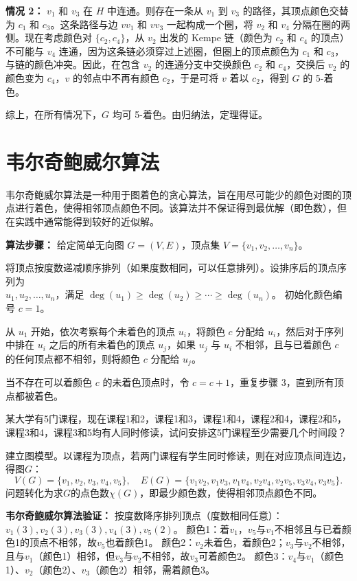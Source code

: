     \textbf{情况 2：} $v_1$ 和 $v_3$ 在 $H$ 中连通。则存在一条从 $v_1$ 到 $v_3$ 的路径，其顶点颜色交替为 $c_1$ 和 $c_3$。这条路径与边 $v v_1$ 和 $v v_3$ 一起构成一个圈，将 $v_2$ 和 $v_4$ 分隔在圈的两侧。现在考虑颜色对 $\{c_2, c_4\}$，从 $v_2$ 出发的 Kempe 链（颜色为 $c_2$ 和 $c_4$ 的顶点）不可能与 $v_4$ 连通，因为这条链必须穿过上述圈，但圈上的顶点颜色为 $c_1$ 和 $c_3$，与链的颜色冲突。因此，在包含 $v_2$ 的连通分支中交换颜色 $c_2$ 和 $c_4$，交换后 $v_2$ 的颜色变为 $c_4$，$v$ 的邻点中不再有颜色 $c_2$，于是可将 $v$ 着以 $c_2$，得到 $G$ 的 5-着色。

    综上，在所有情况下，$G$ 均可 5-着色。由归纳法，定理得证。
\section{韦尔奇鲍威尔算法}
    韦尔奇鲍威尔算法是一种用于图着色的贪心算法，旨在用尽可能少的颜色对图的顶点进行着色，使得相邻顶点颜色不同。该算法并不保证得到最优解（即色数），但在实践中通常能得到较好的近似解。

    \textbf{算法步骤：}
    给定简单无向图 $G=(V,E)$，顶点集 $V=\{v_1,v_2,\ldots,v_n\}$。
    
         将顶点按度数递减顺序排列（如果度数相同，可以任意排列）。设排序后的顶点序列为\\$u_1,u_2,\ldots,u_n$，满足 $\deg(u_1) \ge \deg(u_2) \ge \cdots \ge \deg(u_n)$。
         初始化颜色编号 $c=1$。

         从 $u_1$ 开始，依次考察每个未着色的顶点 $u_i$，将颜色 $c$ 分配给 $u_i$，然后对于序列中排在 $u_i$ 之后的所有未着色的顶点 $u_j$，如果 $u_j$ 与 $u_i$ 不相邻，且与已着颜色 $c$ 的任何顶点都不相邻，则将颜色 $c$ 分配给 $u_j$。

         当不存在可以着颜色 $c$ 的未着色顶点时，令 $c=c+1$，重复步骤 3，直到所有顶点都被着色。
    
\begin{example}{}{}
    某大学有5门课程，现在课程1和2，课程1和3，课程1和4，课程2和4，课程2和5，课程3和4，课程3和5均有人同时修读，试问安排这5门课程至少需要几个时间段？
\end{example}
建立图模型。以课程为顶点，若两门课程有学生同时修读，则在对应顶点间连边，得图$G$：
\[
V(G)=\{v_1,v_2,v_3,v_4,v_5\},\quad
E(G)=\{v_1v_2,v_1v_3,v_1v_4,v_2v_4,v_2v_5,v_3v_4,v_3v_5\}.
\]
问题转化为求$G$的点色数$\chi(G)$，即最少颜色数，使得相邻顶点颜色不同。

\textbf{韦尔奇鲍威尔算法验证：}
 按度数降序排列顶点（度数相同任意）：$v_1(3),v_2(3),v_3(3),v_4(3),v_5(2)$。
 颜色1：着$v_1$，$v_5$与$v_1$不相邻且与已着颜色1的顶点不相邻，故$v_5$也着颜色1。
 颜色2：$v_2$未着色，着颜色2；$v_3$与$v_2$不相邻，且与$v_1$（颜色1）相邻，但$v_3$与$v_2$不相邻，故$v_3$可着颜色2。
 颜色3：$v_4$与$v_1$（颜色1）、$v_2$（颜色2）、$v_3$（颜色2）相邻，需着颜色3。

